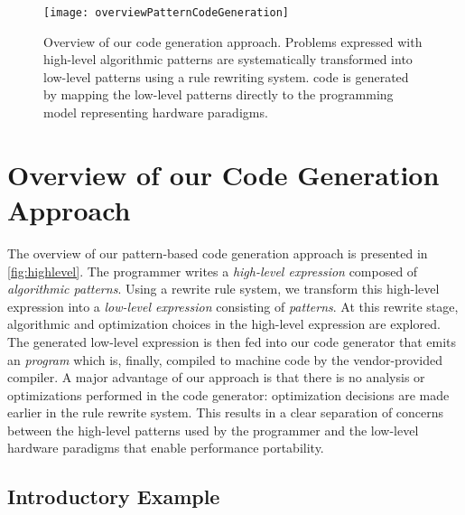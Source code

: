 \begin{figure}[tb]
\centering
\texttt{[image: overviewPatternCodeGeneration]}
\caption[Overview of our code generation approach.]{
Overview of our code generation approach.
Problems expressed with  high-level algorithmic patterns are systematically transformed into low-level \OpenCL patterns using a rule rewriting system.
\OpenCL code is generated by mapping the low-level patterns directly to the \OpenCL programming model representing hardware paradigms.
}
\label{fig:highlevel}
\end{figure}

\section{Overview of our Code Generation Approach}
\label{section:code-generation:overview}

The overview of our pattern-based code generation approach is presented in \autoref{fig:highlevel}.
The programmer writes a \emph{high-level expression} composed of \emph{algorithmic patterns}.
Using a rewrite rule system, we transform this high-level expression into a \emph{low-level expression} consisting of \emph{\OpenCL patterns}.
At this rewrite stage, algorithmic and optimization choices in the high-level expression are explored.
The generated low-level expression is then fed into our code generator that emits an \emph{\OpenCL program} which is, finally, compiled to machine code by the vendor-provided \OpenCL compiler.
A major advantage of our approach is that there is no analysis or optimizations performed in the code generator:
optimization decisions are made earlier in the rule rewrite system.
This results in a clear separation of concerns between the high-level patterns used by the programmer and the low-level hardware paradigms that enable performance portability.


\subsection{Introductory Example}

